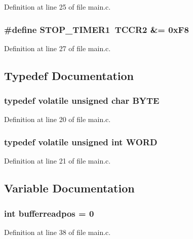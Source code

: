 Definition at line 25 of file main.c.
\subsubsection{\setlength{\rightskip}{0pt plus 5cm}\#define STOP\_\-TIMER1~TCCR2 \&= 0xF8}\label{main_8c_3e94863803e2c858921a285f4becae3e}




Definition at line 27 of file main.c.

\subsection{Typedef Documentation}
\subsubsection{\setlength{\rightskip}{0pt plus 5cm}typedef volatile unsigned char {\bf BYTE}}\label{main_8c_7186b7d7ebb797d6b4404cd4417cb313}




Definition at line 20 of file main.c.
\subsubsection{\setlength{\rightskip}{0pt plus 5cm}typedef volatile unsigned int {\bf WORD}}\label{main_8c_73b876bfec6cf79990efd6dfe2d111bf}




Definition at line 21 of file main.c.

\subsection{Variable Documentation}
\subsubsection{\setlength{\rightskip}{0pt plus 5cm}int {\bf bufferreadpos} = 0}\label{main_8c_712b7d8eddf2a00036e2f198168585fa}




Definition at line 38 of file main.c.
